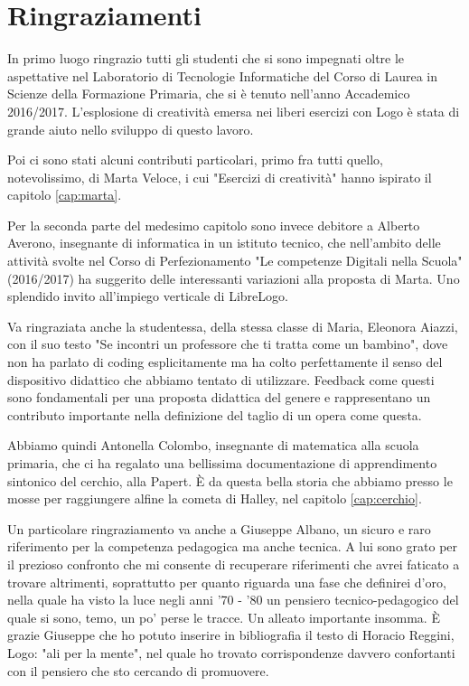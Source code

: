 \tableofcontents
\newpage

\section{Ringraziamenti}

In primo luogo ringrazio tutti gli studenti che si sono impegnati oltre le aspettative nel Laboratorio di Tecnologie Informatiche del Corso di Laurea in Scienze della Formazione Primaria, che si è tenuto nell'anno Accademico 2016/2017. L'esplosione di creatività emersa nei liberi esercizi con Logo è stata di grande aiuto nello sviluppo di questo lavoro. 

Poi ci sono stati alcuni contributi particolari, primo fra tutti quello, notevolissimo, di Marta Veloce, i cui "Esercizi di creatività" hanno ispirato il capitolo \ref{cap:marta}. 

Per la seconda parte del medesimo capitolo sono invece debitore a Alberto Averono, insegnante di informatica in un istituto tecnico, che nell'ambito delle attività svolte nel Corso di Perfezionamento "Le competenze Digitali nella Scuola" (2016/2017) ha suggerito delle interessanti variazioni alla proposta di Marta. Uno splendido invito all'impiego verticale di LibreLogo.

Va ringraziata anche la studentessa, della stessa classe di Maria, Eleonora Aiazzi, con il suo testo "Se incontri un professore che ti tratta come un bambino", dove non ha parlato di coding esplicitamente ma ha colto perfettamente il senso del dispositivo didattico che abbiamo tentato di utilizzare. Feedback come questi sono fondamentali per una proposta didattica del genere e rappresentano un contributo importante nella definizione del taglio di un opera come questa.

Abbiamo quindi Antonella Colombo, insegnante di matematica alla scuola primaria, che ci ha regalato una bellissima documentazione di apprendimento sintonico del cerchio, alla Papert. È da questa bella storia che abbiamo presso le mosse per raggiungere alfine la cometa di Halley, nel capitolo \ref{cap:cerchio}.

Un particolare ringraziamento va anche a Giuseppe Albano, un sicuro e raro riferimento per la competenza pedagogica ma anche tecnica. A lui sono grato per il prezioso confronto che mi consente di recuperare riferimenti che avrei faticato a trovare altrimenti, soprattutto per quanto riguarda una fase che definirei d'oro, nella quale ha visto la luce negli anni '70 - '80 un pensiero tecnico-pedagogico del quale si sono, temo, un po' perse le tracce. Un alleato importante insomma. È grazie Giuseppe che ho potuto inserire in bibliografia il testo di Horacio Reggini, Logo: "ali per la mente"\cite{Reggini}, nel quale ho trovato corrispondenze davvero confortanti con il pensiero che sto cercando di promuovere.

